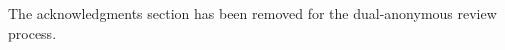 \documentclass[sigconf]{format/acmart}
\begin{document}


\author{Author1}

\author{Author2}

\author{Author3}

\begin{abstract}

\end{abstract}



\maketitle


\begin{acks}
The acknowledgments section has been removed for the dual-anonymous review process.
\end{acks}


\balance

\end{document}
